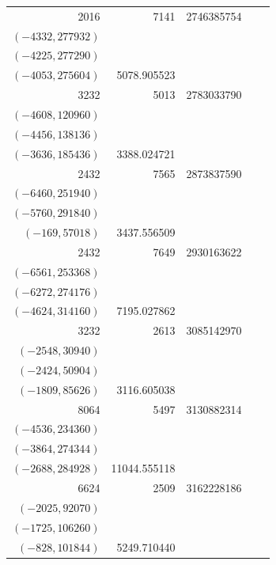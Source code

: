 \documentclass[11pt]{article}
\begin{document}
\begin{longtable}{r r r l r}
2016 & 7141 & 2746385754 & \begin{tabular}[t]{@{}l@{}}$(-6216,217560)$\\$(-4332,277932)$\\$(-4225,277290)$\\$(-4053,275604)$\end{tabular} & 5078.905523\\[5pt]
3232 & 5013 & 2783033790 & \begin{tabular}[t]{@{}l@{}}$(-4949,50904)$\\$(-4608,120960)$\\$(-4456,138136)$\\$(-3636,185436)$\end{tabular} & 3388.024721\\[5pt]
2432 & 7565 & 2873837590 & \begin{tabular}[t]{@{}l@{}}$(-6764,223212)$\\$(-6460,251940)$\\$(-5760,291840)$\\$(-169,57018)$\end{tabular} & 3437.556509\\[5pt]
2432 & 7649 & 2930163622 & \begin{tabular}[t]{@{}l@{}}$(-7056,199248)$\\$(-6561,253368)$\\$(-6272,274176)$\\$(-4624,314160)$\end{tabular} & 7195.027862\\[5pt]
3232 & 2613 & 3085142970 & \begin{tabular}[t]{@{}l@{}}$(-2600,14040)$\\$(-2548,30940)$\\$(-2424,50904)$\\$(-1809,85626)$\end{tabular} & 3116.605038\\[5pt]
8064 & 5497 & 3130882314 & \begin{tabular}[t]{@{}l@{}}$(-5488,25872)$\\$(-4536,234360)$\\$(-3864,274344)$\\$(-2688,284928)$\end{tabular} & 11044.555118\\[5pt]
6624 & 2509 & 3162228186 & \begin{tabular}[t]{@{}l@{}}$(-2392,50232)$\\$(-2025,92070)$\\$(-1725,106260)$\\$(-828,101844)$\end{tabular} & 5249.710440\\[5pt]

\end{longtable}
\end{document}
